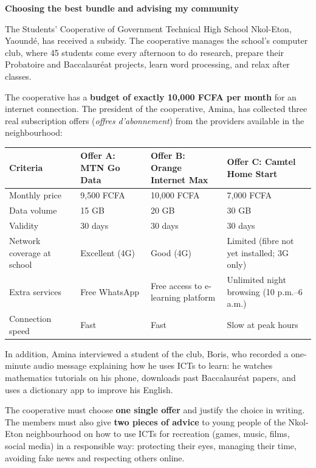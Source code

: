 \documentclass[11pt]{article}
\begin{document}
\textbf{Choosing the best bundle and advising my community}

The Students' Cooperative of Government Technical High School Nkol-Eton, Yaoundé, has received a subsidy. The cooperative manages the school's computer club, where 45 students come every afternoon to do research, prepare their Probatoire and Baccalauréat projects, learn word processing, and relax after classes.

The cooperative has a \textbf{budget of exactly 10,000 FCFA per month} for an internet connection. The president of the cooperative, Amina, has collected three real subscription offers (\emph{offres d'abonnement}) from the providers available in the neighbourhood:

\begin{center}
\begin{tabularx}{\linewidth}{|l|X|X|X|}
\hline
\rowcolor{popblueL} \textbf{Criteria} & \textbf{Offer A: MTN Go Data} & \textbf{Offer B: Orange Internet Max} & \textbf{Offer C: Camtel Home Start} \\
\hline
Monthly price & 9,500 FCFA & 10,000 FCFA & 7,000 FCFA \\
\hline
Data volume & 15 GB & 20 GB & 30 GB \\
\hline
Validity & 30 days & 30 days & 30 days \\
\hline
Network coverage at school & Excellent (4G) & Good (4G) & Limited (fibre not yet installed; 3G only) \\
\hline
Extra services & Free WhatsApp & Free access to e-learning platform & Unlimited night browsing (10 p.m.--6 a.m.) \\
\hline
Connection speed & Fast & Fast & Slow at peak hours \\
\hline
\end{tabularx}
\end{center}

In addition, Amina interviewed a student of the club, Boris, who recorded a one-minute audio message explaining how he uses ICTs to learn: he watches mathematics tutorials on his phone, downloads past Baccalauréat papers, and uses a dictionary app to improve his English.

The cooperative must choose \textbf{one single offer} and justify the choice in writing. The members must also give \textbf{two pieces of advice} to young people of the Nkol-Eton neighbourhood on how to use ICTs for recreation (games, music, films, social media) in a responsible way: protecting their eyes, managing their time, avoiding fake news and respecting others online.
\end{document}

